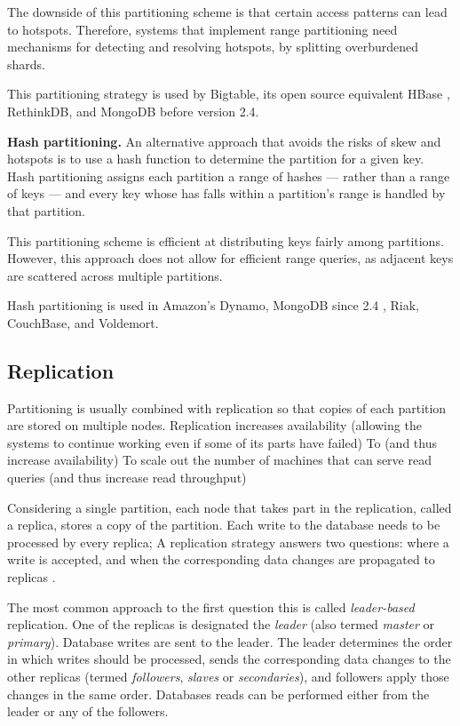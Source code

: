 The downside of this partitioning scheme is that certain access patterns can lead to hotspots.
Therefore, systems that implement range partitioning need mechanisms for detecting and resolving hotspots, by splitting
overburdened shards.

This partitioning strategy is used by Bigtable, its open source equivalent HBase \cite{hbasebigtable:comparison}, RethinkDB,
and MongoDB before version 2.4.

\bigskip
\noindent
\textbf{Hash partitioning.}
An alternative approach that avoids the risks of skew and hotspots is to use a hash function to determine the partition
for a given key.
Hash partitioning assigns each partition a range of hashes --- rather than a range of keys --- and every key whose has
falls within a partition's range is handled by that partition.

This partitioning scheme is efficient at distributing keys fairly among partitions.
However, this approach does not allow for efficient range queries, as adjacent keys are scattered across multiple
partitions.

Hash partitioning is used in Amazon's Dynamo, MongoDB since 2.4 \cite{mongo:hashpartitioning}, Riak, CouchBase,
and Voldemort.

\subsection{Replication}

Partitioning is usually combined with replication so that copies of each partition are stored on multiple nodes.
Replication increases availability (allowing the systems to continue working even if some of its parts have failed)
To  (and thus increase availability)
To scale out the number of machines that can serve read queries (and thus increase read throughput)

Considering a single partition, each node that takes part in the replication, called a replica, stores a copy of the
partition.
Each write to the database needs to be processed by every replica;
A replication strategy answers two questions: where a write is accepted, and when the corresponding data changes are
propagated to replicas \cite{gray:replication}.

\bigskip
\noindent
The most common approach to the first question this is called \textit{leader-based} replication.
One of the replicas is designated the \textit{leader} (also termed \textit{master} or \textit{primary}).
Database writes are sent to the leader.
The leader determines the order in which writes should be processed, sends the corresponding data changes to the other
replicas (termed \textit{followers}, \textit{slaves} or \textit{secondaries}),
and followers apply those changes in the same order.
Databases reads can be performed either from the leader or any of the followers.


